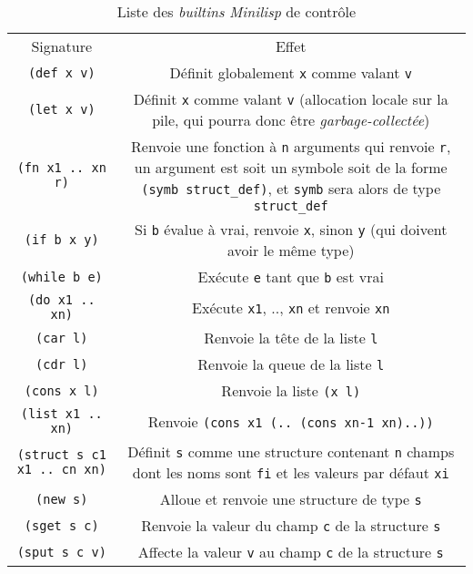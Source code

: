 \documentclass[a4paper, 10pt, french]{article}
\newcommand{\codeLisp}[1]{\texttt{#1}}
\newcommand{\code}[1]{\texttt{#1}}
\newcommand{\foreign}[1]{\emph{#1}}
\begin{document}
\begin{table}[H]
  \centering
  \begin{tabularx}{\linewidth}{|C|C|}
    \hline
    Signature & Effet \tabularnewline
    \hhline{|=|=|}
    \codeLisp{(def x v)} & Définit globalement \codeLisp{x} comme valant \codeLisp{v} \tabularnewline
    \hline
    \codeLisp{(let x v)} & Définit \codeLisp{x} comme valant \codeLisp{v} (allocation locale sur la pile, qui pourra donc être \foreign{garbage-collectée}) \tabularnewline
    \hline
    \codeLisp{(fn x1 .. xn r)} & Renvoie une fonction à \code{n} arguments qui renvoie \codeLisp{r}, un argument est soit un symbole soit de la forme \codeLisp{(symb struct_def)}, et \codeLisp{symb} sera alors de type \codeLisp{struct_def} \tabularnewline
    \hhline{|=|=|}
    \codeLisp{(if b x y)} & Si \codeLisp{b} évalue à vrai, renvoie \codeLisp{x}, sinon \codeLisp{y} (qui doivent avoir le même type) \tabularnewline
    \hline
    \codeLisp{(while b e)} & Exécute \codeLisp{e} tant que \codeLisp{b} est vrai \tabularnewline
    \hline
    \codeLisp{(do x1 .. xn)} & Exécute \codeLisp{x1}, .., \codeLisp{xn} et renvoie \codeLisp{xn} \tabularnewline
    \hhline{|=|=|}
    \codeLisp{(car l)} & Renvoie la tête de la liste \codeLisp{l} \tabularnewline
    \hline
    \codeLisp{(cdr l)} & Renvoie la queue de la liste \codeLisp{l} \tabularnewline
    \hline
    \codeLisp{(cons x l)} & Renvoie la liste \codeLisp{(x l)} \tabularnewline
    \hline
    \codeLisp{(list x1 .. xn)} & Renvoie \codeLisp{(cons x1 (.. (cons xn-1 xn)..))} \tabularnewline
    \hhline{|=|=|}
    \codeLisp{(struct s c1 x1 .. cn xn)} & Définit \codeLisp{s} comme une structure contenant \code{n} champs dont les noms sont \codeLisp{fi} et les valeurs par défaut \codeLisp{xi} \tabularnewline
    \hline
    \codeLisp{(new s)} & Alloue et renvoie une structure de type \codeLisp{s} \tabularnewline
    \hline
    \codeLisp{(sget s c)} & Renvoie la valeur du champ \codeLisp{c} de la structure \codeLisp{s} \tabularnewline
    \hline
    \codeLisp{(sput s c v)} & Affecte la valeur \codeLisp{v} au champ \codeLisp{c} de la structure \codeLisp{s} \tabularnewline
    \hline
  \end{tabularx}
  \caption{Liste des \foreign{builtins} \foreign{Minilisp} de contrôle}
\end{table}
\end{document}
